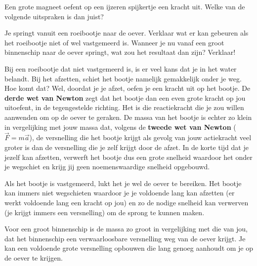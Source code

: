 \documentclass{ximera}
\begin{document}
\begin{exercise}
	Een grote magneet oefent op een ijzeren spijkertje een kracht uit. Welke van de volgende uitspraken is dan juist?
	\begin{multipleChoice}
	\end{multipleChoice}
\end{exercise}

\begin{exercise}
	Je springt vanuit een roeibootje naar de oever. Verklaar wat er kan gebeuren als het roeibootje niet of wel vastgemeerd is. Wanneer je nu vanaf een groot binnenschip naar de oever springt, wat zou het resultaat dan zijn? Verklaar!
	\begin{oplossing}
		Bij een roeibootje dat niet vastgemeerd is, is er veel kans dat je in het water belandt. Bij het afzetten, schiet het bootje namelijk gemakkelijk onder je weg. Hoe komt dat? Wel, doordat je je afzet, oefen je een kracht uit op het bootje. De \textbf{derde wet van Newton} zegt dat het bootje dan een even grote kracht op jou uitoefent, in de tegengestelde richting. Het is die reactiekracht die je zou willen aanwenden om op de oever te geraken. De massa van het bootje is echter zo klein in vergelijking met jouw massa dat, volgens de \textbf{tweede wet van Newton} ($\vec{F}=m\vec{a}$), de versnelling die het bootje krijgt als gevolg van jouw actiekracht veel groter is dan de versnelling die je zelf krijgt door de afzet. In de korte tijd dat je jezelf kan afzetten, verwerft het bootje dus een grote snelheid waardoor het onder je wegschiet en krijg jij geen noemenswaardige snelheid opgebouwd.

		Als het bootje is vastgemeerd, lukt het je wel de oever te bereiken. Het bootje kan immers niet wegschieten waardoor je je voldoende lang kan afzetten (er werkt voldoende lang een kracht op jou) en zo de nodige snelheid kan verwerven (je krijgt immers een versnelling) om de sprong te kunnen maken.

		Voor een groot binnenschip is de massa zo groot in vergelijking met die van jou, dat het binnenschip een verwaarloosbare versnelling weg van de oever krijgt. Je kan een voldoende grote versnelling opbouwen die lang genoeg aanhoudt om je op de oever te krijgen.
	\end{oplossing}
\end{exercise}
\end{document}
